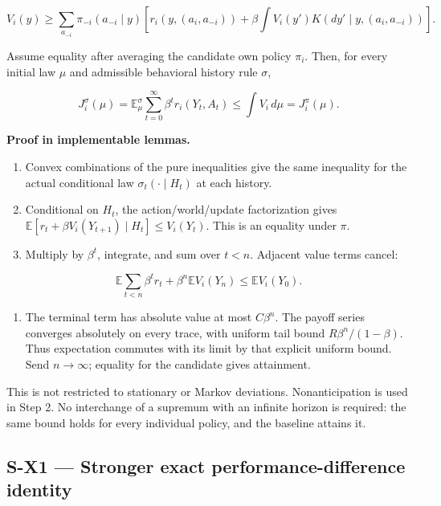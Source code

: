 \documentclass[
  11pt,
  a4paper,
]{article}
\providecommand{\tightlist}{%
  \setlength{\itemsep}{0pt}\setlength{\parskip}{0pt}}
\begin{document}
\[V_i(y)\ge \sum_{a_{-i}}\pi_{-i}(a_{-i}\mid y)
\left[r_i(y,(a_i,a_{-i}))+
\beta\int V_i(y')K(dy'\mid y,(a_i,a_{-i}))\right].\]

Assume equality after averaging the candidate own policy \(\pi_i\).
Then, for every initial law \(\mu\) and admissible behavioral history
rule \(\sigma\),

\[J_i^\sigma(\mu)=
\mathbb E_\mu^\sigma\sum_{t=0}^\infty\beta^t r_i(Y_t,A_t)
\le\int V_i\,d\mu
=J_i^\pi(\mu).\]

\textbf{Proof in implementable lemmas.}

\begin{enumerate}
\def\labelenumi{\arabic{enumi}.}
\tightlist
\item
  Convex combinations of the pure inequalities give the same inequality
  for the actual conditional law \(\sigma_t(\cdot\mid H_t)\) at each
  history.
\item
  Conditional on \(H_t\), the action/world/update factorization gives
  \(\mathbb E[r_t+\beta V_i(Y_{t+1})\mid H_t]\le V_i(Y_t)\). This is an
  equality under \(\pi\).
\item
  Multiply by \(\beta^t\), integrate, and sum over \(t<n\). Adjacent
  value terms cancel:
\end{enumerate}

\[\mathbb E\sum_{t<n}\beta^t r_t+
\beta^n\mathbb E V_i(Y_n)\le\mathbb E V_i(Y_0).\]

\begin{enumerate}
\def\labelenumi{\arabic{enumi}.}
\setcounter{enumi}{3}
\tightlist
\item
  The terminal term has absolute value at most \(C\beta^n\). The payoff
  series converges absolutely on every trace, with uniform tail bound
  \(R\beta^n/(1-\beta)\). Thus expectation commutes with its limit by
  that explicit uniform bound. Send \(n\to\infty\); equality for the
  candidate gives attainment.
\end{enumerate}

This is not restricted to stationary or Markov deviations.
Nonanticipation is used in Step 2. No interchange of a supremum with an
infinite horizon is required: the same bound holds for every individual
policy, and the baseline attains it.

\subsection{S-X1 --- Stronger exact performance-difference
identity}\label{s-x1-stronger-exact-performance-difference-identity}
\end{document}
